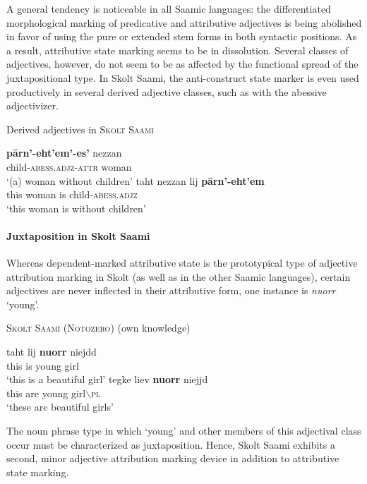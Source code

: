 A general tendency is noticeable in all Saamic languages: the differentiated morphological marking of predicative and attributive adjectives is being abolished in favor of using the pure or extended stem forms in both syntactic positions. As a result, attributive state marking seems to be in dissolution. Several classes of adjectives, however, do not seem to be as affected by the functional spread of the juxtapositional type. In Skolt Saami, the anti-construct state marker is even used productively in several derived adjective classes, such as with the abessive adjectivizer.
\begin{exe}
\ex Derived adjectives in \textsc{Skolt Saami} \citep[279]{senkevic-g1968}
\begin{xlist}
\ex
\gll	\textbf{pārn'-eht'em'-es'} nezzan\\
	child-\textsc{abess.adjz-attr} woman\\
\glt	‘(a) woman without children’
\ex
\gll 	taht nezzan lij \textbf{pārn'-eht'em}\\
	this woman is child-\textsc{abess.adjz}\\
\glt	‘this woman is without children’
\end{xlist}
\end{exe}

\paragraph{Juxtaposition in Skolt Saami}
Whereas dependent-marked attributive state is the prototypical type of adjective attribution marking in Skolt (as well as in the other Saamic languages), certain adjectives are never inflected in their attributive form, one instance is \textit{nuorr} ‘young’.
\begin{exe}
\ex \textsc{Skolt Saami (Notozero)} (own knowledge)
\begin{xlist}
\ex
\gll 	taht lij \textbf{nuorr} niejdd\\
	this is young girl\\
\glt	‘this is a beautiful girl’
\ex	
\gll	tegke liev \textbf{nuorr} niejjd\\
	this are young girl$\backslash$\textsc{pl}\\
\glt	‘these are beautiful girls’
\end{xlist}
\end{exe}
The noun phrase type in which ‘young’ and other members of this adjectival class occur must be characterized as {juxtaposition}. Hence, Skolt Saami exhibits a second, minor adjective attribution marking device in addition to attributive state marking.

